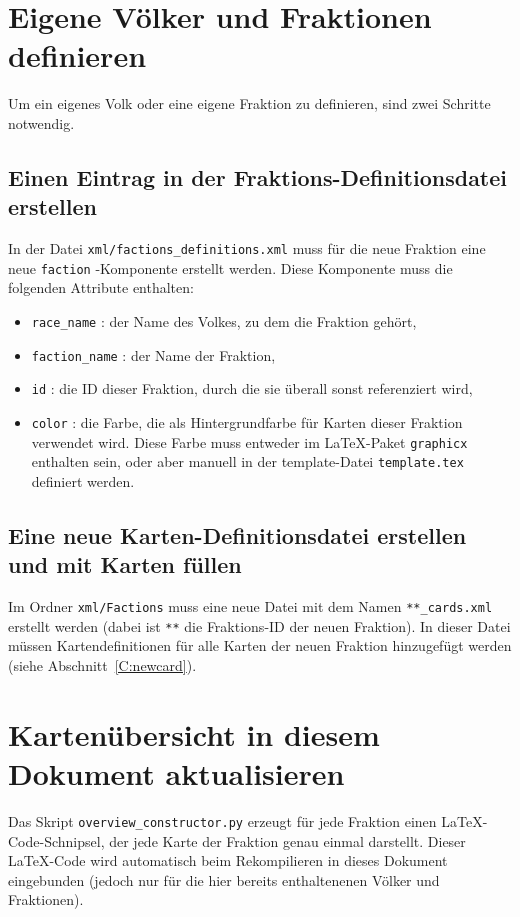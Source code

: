 \documentclass[a4paper,11pt]{report}
\newcommand{\sref}[1]{Abschnitt~\ref{#1}}
\begin{document}
\section{Eigene Völker und Fraktionen definieren}
Um ein eigenes Volk oder eine eigene Fraktion zu definieren, sind zwei Schritte notwendig.

\subsection{Einen Eintrag in der Fraktions-Definitionsdatei erstellen}
In der Datei \verb+xml/factions_definitions.xml+ muss für die neue Fraktion eine neue \verb+faction+ -Komponente erstellt werden. Diese Komponente muss die folgenden Attribute enthalten:
\begin{itemize}
	\item \verb+race_name+ : der Name des Volkes, zu dem die Fraktion gehört,
	\item \verb+faction_name+ : der Name der Fraktion,
	\item \verb+id+ : die ID dieser Fraktion, durch die sie überall sonst referenziert wird,
	\item \verb+color+ : die Farbe, die als Hintergrundfarbe für Karten dieser Fraktion verwendet wird. Diese Farbe muss entweder im \LaTeX -Paket \verb+graphicx+ enthalten sein, oder aber manuell in der template-Datei \verb+template.tex+ definiert werden.
\end{itemize}

\subsection{Eine neue Karten-Definitionsdatei erstellen und mit Karten füllen}
Im Ordner \verb+xml/Factions+ muss eine neue Datei mit dem Namen \verb+**_cards.xml+ erstellt werden (dabei ist \verb+**+ die Fraktions-ID der neuen Fraktion). In dieser Datei müssen Kartendefinitionen für alle Karten der neuen Fraktion hinzugefügt werden (siehe \sref{C:newcard}).

\section{Kartenübersicht in diesem Dokument aktualisieren}
Das Skript \verb+overview_constructor.py+ erzeugt für jede Fraktion einen \LaTeX -Code-Schnipsel, der jede Karte der Fraktion genau einmal darstellt. Dieser \LaTeX -Code wird automatisch beim Rekompilieren in dieses Dokument eingebunden (jedoch nur für die hier bereits enthaltenenen Völker und Fraktionen). 
\end{document}
